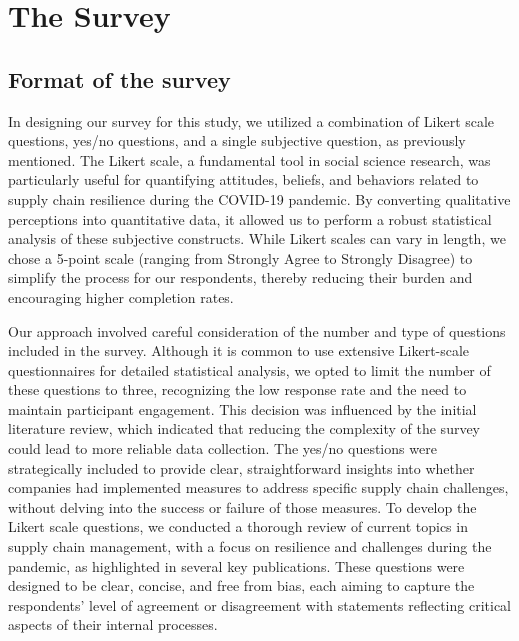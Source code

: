 \section{The Survey}

\subsection{Format of the survey}
In designing our survey for this study, we utilized a combination of Likert scale questions, yes/no questions, and a single subjective question, as previously mentioned. The Likert scale, a fundamental tool in social science research, was particularly useful for quantifying attitudes, beliefs, and behaviors related to supply chain resilience during the COVID-19 pandemic. By converting qualitative perceptions into quantitative data, it allowed us to perform a robust statistical analysis of these subjective constructs. While Likert scales can vary in length, we chose a 5-point scale (ranging from Strongly Agree to Strongly Disagree) to simplify the process for our respondents, thereby reducing their burden and encouraging higher completion rates. 

Our approach involved careful consideration of the number and type of questions included in the survey. Although it is common to use extensive Likert-scale questionnaires for detailed statistical analysis, we opted to limit the number of these questions to three, recognizing the low response rate and the need to maintain participant engagement. This decision was influenced by the initial literature review, which indicated that reducing the complexity of the survey could lead to more reliable data collection. The yes/no questions were strategically included to provide clear, straightforward insights into whether companies had implemented measures to address specific supply chain challenges, without delving into the success or failure of those measures. To develop the Likert scale questions, we conducted a thorough review of current topics in supply chain management, with a focus on resilience and challenges during the pandemic, as highlighted in several key publications. These questions were designed to be clear, concise, and free from bias, each aiming to capture the respondents' level of agreement or disagreement with statements reflecting critical aspects of their internal processes. 

